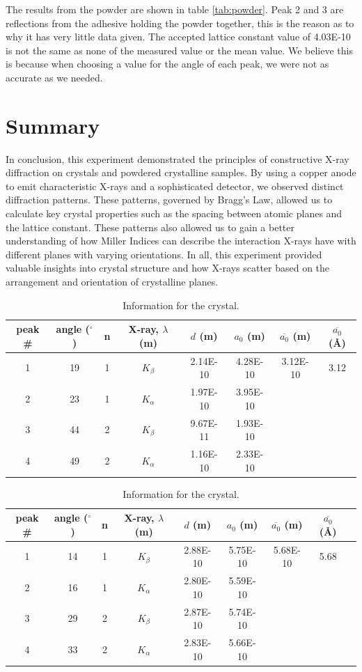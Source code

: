 \documentclass[a4paper,12pt,english]{all-in-one} %
\begin{document}
\begin{multicols}{2}
{The results from the  powder are shown in table \ref{tab:powder}. Peak 2 and 3 are reflections from the adhesive holding the powder together, this is the reason as to why it has very little data given. The accepted lattice constant value of 4.03E-10 is not the same as none of the measured value or the mean value. We believe this is because when choosing a value for the angle of each peak, we were not as accurate as we needed. 
}


\end{multicols}

\section*{Summary}
{
In conclusion, this experiment demonstrated the principles of constructive X-ray diffraction on crystals and powdered crystalline samples. By using a copper anode to emit characteristic X-rays and a sophisticated detector, we observed distinct diffraction patterns. These patterns, governed by Bragg’s Law, allowed us to calculate key crystal properties such as the spacing between atomic planes and the lattice constant. These patterns also allowed us to gain a better understanding of how Miller Indices can describe the interaction X-rays have with different planes with varying orientations. In all, this experiment provided valuable insights into crystal structure and how X-rays scatter based on the arrangement and orientation of crystalline planes.
}

\begin{table}[]
\centering
\begin{tabular}{c|c|c|c|c|c|c|c}
peak \# & angle ($^\circ$) & n & X-ray, $\lambda$ (m) & $d$ (m) & $a_0$ (m) & $\overline{a_0}$ (m) & $\overline{a_0}$ (\AA) \\ \hline
1 & 19 & 1 & $K_\beta$ & 2.14E-10 & 4.28E-10  & 3.12E-10 & 3.12\\
2 & 23 & 1 & $K_\alpha$ & 1.97E-10 & 3.95E-10 \\
3 & 44 & 2 & $K_\beta$ & 9.67E-11	& 1.93E-10\\
4 & 49 & 2 & $K_\alpha$ & 1.16E-10 & 2.33E-10 \\   
\end{tabular}
\caption{Information for the  crystal.}
\label{tab:LiF}
\end{table}

\begin{table}[]
\centering
\begin{tabular}{c|c|c|c|c|c|c|c|c}
peak \# & angle ($^\circ$) & n & X-ray, $\lambda$ (m) & $d$ (m) & $a_0$ (m) & $\overline{a_0}$ (m) & $\overline{a_0}$ (\AA) \\ \hline
1 & 14 & 1 & $K_\beta$ & 2.88E-10 & 5.75E-10 & 5.68E-10 & 5.68 \\
2 & 16 & 1 & $K_\alpha$ & 2.80E-10 & 5.59E-10 \\
3 & 29 & 2 & $K_\beta$ & 2.87E-10 & 5.74E-10\\
4 & 33 & 2 & $K_\alpha$ & 2.83E-10 & 5.66E-10 \\  
\end{tabular}
\caption{Information for the  crystal.}
\label{tab:NaCl}
\end{table}
\end{document}
